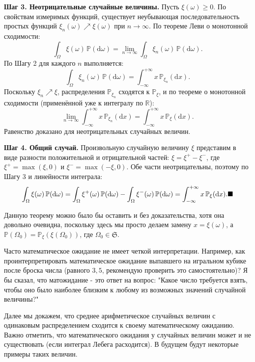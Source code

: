 \textbf{Шаг 3. Неотрицательные случайные величины.} Пусть $\xi(\omega) \geqslant 0$. По свойствам измеримых функций, существует неубывающая последовательность простых функций $\xi_n(\omega) \nearrow \xi(\omega)$ при $n \to \infty$. По теореме Леви о монотонной сходимости:
\[
\int_{\Omega} \xi(\omega) \, \mathbb{P}(\mathrm{d}\omega) = \lim_{n \to \infty} \int_{\Omega} \xi_n(\omega) \, \mathbb{P}(\mathrm{d}\omega).
\]
По Шагу 2 для каждого $n$ выполняется:
\[
\int_{\Omega} \xi_n(\omega) \, \mathbb{P}(\mathrm{d}\omega) = \int_{-\infty}^{+\infty} x \, \mathbb{P}_{\xi_n}(\mathrm{d}x).
\]
Поскольку $\xi_n \nearrow \xi$, распределения $\mathbb{P}_{\xi_n}$ сходятся к $\mathbb{P}_{\xi}$, и по теореме о монотонной сходимости (применённой уже к интегралу по $\mathbb{R}$):
\[
\lim_{n \to \infty} \int_{-\infty}^{+\infty} x \, \mathbb{P}_{\xi_n}(\mathrm{d}x) = \int_{-\infty}^{+\infty} x \, \mathbb{P}_{\xi}(\mathrm{d}x).
\]
Равенство доказано для неотрицательных случайных величин.

\textbf{Шаг 4. Общий случай.} Произвольную случайную величину $\xi$ представим в виде разности положительной и отрицательной частей: $\xi = \xi^+ - \xi^-$, где $\xi^+ = \max(\xi, 0)$ и $\xi^- = \max(-\xi, 0)$. Обе части неотрицательны, поэтому по Шагу 3 и линейности интеграла:
\[
\int_{\Omega} \xi(\omega) \, \mathbb{P}(\mathrm{d}\omega) = \int_{\Omega} \xi^+(\omega) \, \mathbb{P}(\mathrm{d}\omega) - \int_{\Omega} \xi^-(\omega) \, \mathbb{P}(\mathrm{d}\omega) = \int_{-\infty}^{+\infty} x \, \mathbb{P}_{\xi}(\mathrm{d}x). \hfill \blacksquare
\]

Данную теорему можно было бы оставить и без доказательства, хотя она довольно очевидна, поскольку здесь мы просто делаем замену $x = \xi(\omega)$, а $\mathbb{P}(\Omega_0) = \mathbb{P}_{\xi}(\xi(\Omega_0))$, где $\Omega_0 \in \mathfrak{S}$.

\bigskip

Часто математическое ожидание не имеет четкой интерпретации. Например, как проинтерпретировать математическое ожидание выпавшего на игральном кубике после броска числа (равного $3,5$, рекомендую проверить это самостоятельно)? Я бы сказал, что матожидание - это ответ на вопрос: "Какое число требуется взять, чтобы оно было наиболее близким к любому из возможных значений случайной величины?"

\begin{notice}
Далее мы докажем, что среднее арифметическое случайных величин с одинаковым распределением сходится к своему математическому ожиданию.\\

Важно отметить, что математического ожидания у случайных величин может и не существовать (если интеграл Лебега расходится). В будущем будут некоторые примеры таких величин.
\end{notice}

